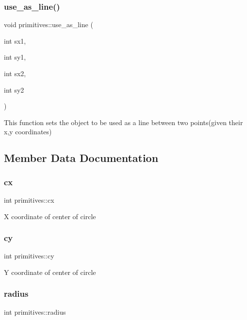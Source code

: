\subsubsection{\texorpdfstring{use\+\_\+as\+\_\+line()}{use\_as\_line()}}
{\footnotesize\ttfamily void primitives\+::use\+\_\+as\+\_\+line (\begin{DoxyParamCaption}\item[{int}]{sx1,  }\item[{int}]{sy1,  }\item[{int}]{sx2,  }\item[{int}]{sy2 }\end{DoxyParamCaption})}

This function sets the object to be used as a line between two points(given their x,y coordinates) 

\subsection{Member Data Documentation}
\mbox{\label{classprimitives_a46988726c6e4edf41a2c1d82d61565a5}} 
\subsubsection{\texorpdfstring{cx}{cx}}
{\footnotesize\ttfamily int primitives\+::cx\hspace{0.3cm}{\ttfamily [private]}}

X coordinate of center of circle \mbox{\label{classprimitives_ab924e60ca6c29f90e0830719e3966d6a}} 
\subsubsection{\texorpdfstring{cy}{cy}}
{\footnotesize\ttfamily int primitives\+::cy\hspace{0.3cm}{\ttfamily [private]}}

Y coordinate of center of circle \mbox{\label{classprimitives_a0091dfd2f3dffce09b1e78884eeb8d79}} 
\subsubsection{\texorpdfstring{radius}{radius}}
{\footnotesize\ttfamily int primitives\+::radius\hspace{0.3cm}{\ttfamily [private]}}

